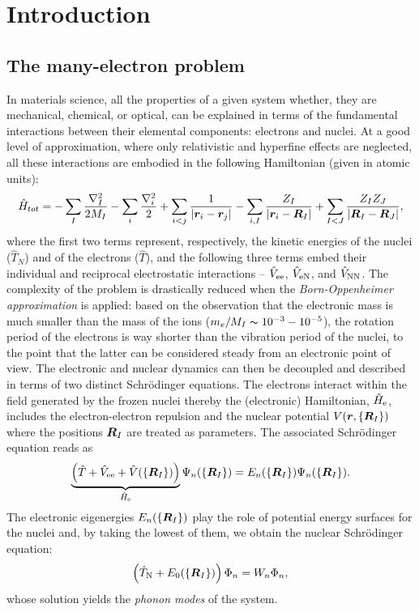 \cleardoublepage
\chapter{Introduction\label{ch:introduction}}

\section{The many-electron problem}
In materials science, all the properties of a given system whether, they are mechanical, chemical, or optical, can be explained in terms of the fundamental interactions between their elemental components: electrons and nuclei. At a good level of approximation, where only relativistic and hyperfine effects are neglected, all these interactions are embodied in the following Hamiltonian (given in atomic units):
%
\begin{equation}
    \hat{H}_{tot} = - \sum_I \frac{\nabla_I^2}{2M_I} - \sum_i \frac{\nabla_i^2}{2} + \sum_{i < j} \frac{1}{|{\bm r}_i - {\bm r}_j|} - \sum_{i,I} \frac{Z_I}{|{\bm r}_i - {\bm R}_I|} + \sum_{I < J} \frac{Z_I Z_J}{|{\bm R}_I - {\bm R}_J|} ,
    \label{eq:many-body}
\end{equation}
%
where the first two terms represent, respectively, the kinetic energies of the nuclei ($\hat{T}_N$) and of the electrons ($\hat{T}$), and the following three terms embed their individual and reciprocal electrostatic interactions -- $\hat{V}_{\rm ee}$, $\hat{V}_{\rm eN}$, and $\hat{V}_{\rm NN}$. The complexity of the problem is drastically reduced when the \emph{Born-Oppenheimer approximation} is applied: based on the observation that the electronic mass is much smaller than the mass of the ions ($m_e / M_I \thicksim 10^{-3} - 10^{-5}$), the rotation period of the electrons is way shorter than the vibration period of the nuclei, to the point that the latter can be considered steady from an electronic point of view. The electronic and nuclear dynamics can then be decoupled and described in terms of two distinct Schr\"{o}dinger equations. The electrons interact within the field generated by the frozen nuclei thereby the (electronic) Hamiltonian, $\hat{H}_{\rm e}$, includes the electron-electron repulsion and the nuclear potential $V({\bm r},\{ {\bm R}_I \})$ where the positions ${\bm R}_I$ are treated as parameters. The associated Schr\"{o}dinger equation reads as
%
\begin{equation}
    \underbrace{\left( \hat{T} + \hat{V}_{\rm ee} + \hat{V}(\{ {\bm R}_I \}) \right)}_{\hat{H}_{\rm e}} \Psi_n(\{ {\bm R}_I \}) = E_n(\{ {\bm R}_I \}) \Psi_n(\{ {\bm R}_I \}) .
    \label{eq:many-electron-problem}
\end{equation}
%
The electronic eigenergies $E_n(\{ {\bm R}_I \})$ play the role of potential energy surfaces for the nuclei and, by taking the lowest of them, we obtain the nuclear Schr\"{o}dinger equation:
%
\begin{equation}
    \left( \hat{T}_{\rm N} + E_0(\{ {\bm R}_I \}) \right) \Phi_n = W_n \Phi_n ,
    \label{eq:nuclear-schrodinger-eq}
\end{equation}
%
whose solution yields the \emph{phonon modes} of the system.

